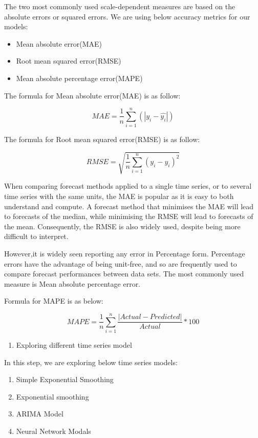 \documentclass[12pt,openany]{book}
\providecommand{\tightlist}{%
  \setlength{\itemsep}{0pt}\setlength{\parskip}{0pt}}
\begin{document}
The two most commonly used scale-dependent measures are based on the absolute errors or squared errors. We are using below accuracy metrics for our models:

\begin{itemize}
\tightlist
\item
  Mean absolute error(MAE)
\item
  Root mean squared error(RMSE)
\item
  Mean absolute percentage error(MAPE)
\end{itemize}

The formula for Mean absolute error(MAE) is as follow:

\[ MAE = {\frac{1}{n}\sum_{i=1}^{n}(|y_{i} - \hat{y_i}|)}\]

The formula for Root mean squared error(RMSE) is as follow:

\[ RMSE = \sqrt{\frac{1}{n}\sum_{i=1}^{n}(y_{i} - \hat{y_i})^2}\]

When comparing forecast methods applied to a single time series, or to several time series with the same units, the MAE is popular as it is easy to both understand and compute. A forecast method that minimises the MAE will lead to forecasts of the median, while minimising the RMSE will lead to forecasts of the mean. Consequently, the RMSE is also widely used, despite being more difficult to interpret.

However,it is widely seen reporting any error in Percentage form.
Percentage errors have the advantage of being unit-free, and so are frequently used to compare forecast performances between data sets. The most commonly used measure is Mean absolute percentage error.

Formula for MAPE is as below:

\[MAPE = \frac{1}{n}\sum_{i=1}^{n}\frac{|Actual - Predicted|}{Actual} * 100\]

\begin{enumerate}
\def\labelenumi{\arabic{enumi}.}
\setcounter{enumi}{2}
\tightlist
\item
  Exploring different time series model
\end{enumerate}

In this step, we are exploring below time series models:

\begin{enumerate}
\def\labelenumi{\arabic{enumi}.}
\tightlist
\item
  Simple Exponential Smoothing
\item
  Exponential smoothing
\item
  ARIMA Model
\item
  Neural Network Modals
\end{enumerate}
\end{document}
